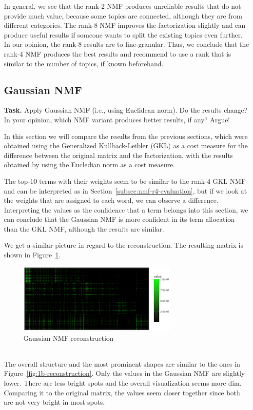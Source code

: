 \documentclass{support/acm_proc_article-sp}
\begin{document}
    In general, we see that the rank-2 NMF produces unreliable results that do not provide much value, because some topics
    are connected, although they are from different categories.
    The rank-8 NMF improves the factorization slightly and can produce useful results if someone wants to split the
    existing topics even further.
    In our opinion, the rank-8 results are to fine-granular.
    Thus, we conclude that the rank-4 NMF produces the best results and recommend to use a rank that is similar
    to the number of topics, if known beforehand.


    \subsection{Gaussian NMF}

    \textbf{Task.} Apply Gaussian NMF (i.e., using Euclidean norm).
    Do the results change?
    In your opinion, which NMF variant produces better results, if any?
    Argue!

    In this section we will compare the results from the previous sections, which were obtained using the
    Generalized Kullback-Leibler (GKL) as a cost measure for the difference between the original matrix and the factorization,
    with the results obtained by using the Eucledian norm as a cost measure.

    The top-10 terms with their weights seem to be similar to the rank-4 GKL NMF and can be interpreted as in
    Section~\ref{subsec:nmf-r4-evaluation}, but if we look at the weights that are assigned to each word, we can observe
    a difference.
    Interpreting the values as the confidence that a term belongs into this section, we can conclude that the
    Gaussian NMF is more confident in its term allocation than the GKL NMF, although the results are similar.

    We get a similar picture in regard to the reconstruction.
    The resulting matrix is shown in Figure~\ref{fig:1e-gaussian}.
    \begin{figure}[htbp]
        \centering
        \includegraphics[width=8cm]{images/1e-gaussian.png}
        \caption{Gaussian NMF reconstruction}
        \label{fig:1e-gaussian}
    \end{figure} \\
    The overall structure and the most prominent shapes are similar to the ones in Figure~\ref{fig:1b-reconstruction}.
    Only the values in the Gaussian NMF are slightly lower.
    There are less bright spots and the overall visualization seems more dim.
    Comparing it to the original matrix, the values seem closer together since both are not very bright in most spots.
\end{document}

